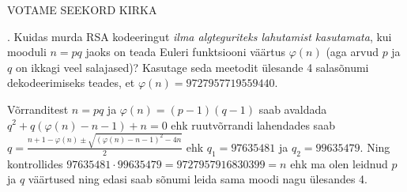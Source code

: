 \documentclass[a4paper, 10pt]{article}
\begin{document}
VOTAME SEEKORD KIRKA


\bigskip

. Kuidas murda RSA kodeeringut \emph{ilma algteguriteks lahutamist kasutamata}, kui mooduli $n=pq$ jaoks on teada Euleri funktsiooni väärtus $\varphi(n)$ (aga arvud $p$ ja $q$ on ikkagi veel salajased)? Kasutage seda meetodit ülesande 4 salasõnumi dekodeerimiseks teades, et $\varphi(n)=9727957719559440$.


\bigskip
Võrranditest $n=pq$ ja $\varphi(n)=(p-1)(q-1)$ saab avaldada $q^2+q(\varphi(n)-n-1)+n=0$ ehk ruutvõrrandi lahendades saab $q=\frac{n+1-\varphi(n)\pm\sqrt{(\varphi(n)-n-1)^2-4n}}2$ ehk $q_1=97635481$ ja $q_2=99635479$. Ning kontrollides $97635481\cdot99635479=9727957916830399=n$ ehk ma olen leidnud $p$ ja $q$ väärtused ning edasi saab sõnumi leida sama moodi nagu ülesandes 4.
\bigskip


\bigskip


\bigskip
\end{document}
